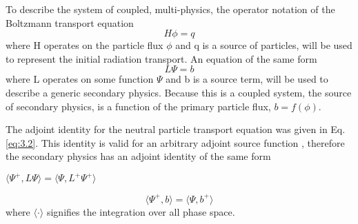 To describe the system of coupled, multi-physics,
the operator notation of the Boltzmann transport equation
\begin{equation}
	H\phi = q
\end{equation}
where H operates on the particle flux $\phi$ and q is a source of particles, 
will be used to represent the initial radiation transport.
An equation of the same form 
\begin{equation}
	L\Psi = b
\end{equation}
where L operates
on some function $\Psi$ and b is a source term, will be used
to describe a generic secondary physics.
Because this is a coupled system, the source of secondary physics, is a function
of the primary particle flux, $b = f(\phi)$.

The adjoint identity for the neutral particle transport
equation was given in Eq. \ref{eq:3.2}.
This identity is valid for an arbitrary
adjoint source function
\cite{l_m}, therefore the secondary physics has an adjoint identity of the same
form
\begin{center}
{$\langle \Psi^{+}, L\Psi \rangle = \langle \Psi, L^{+}\Psi^{+} \rangle $}
\end{center}
\begin{equation}\label{eq:adj_2_identity}
	\langle \Psi^{+}, b \rangle =
	\langle \Psi, b^{+} \rangle 
\end{equation}
where $\langle \cdot \rangle$ signifies the integration over all phase space.

